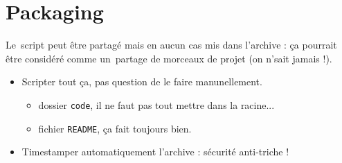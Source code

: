 \section{Packaging}
Le~script peut être partagé mais en aucun cas mis dans l'archive : ça pourrait être considéré comme un~partage de morceaux de projet (on n'sait jamais !).
\begin{itemize}
	\item Scripter tout ça, pas question de le faire manunellement.
        \begin{itemize}
            \item dossier \texttt{code}, il ne faut pas tout mettre dans la racine...
            \item fichier \texttt{README}, ça fait toujours bien.
        \end{itemize}
	\item Timestamper automatiquement l'archive : sécurité anti-triche !
\end{itemize}
